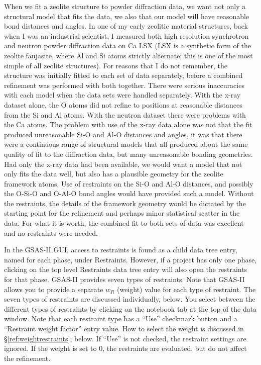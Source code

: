 When we fit a zeolite structure to powder diffraction data, we want not only a structural model that fits the data, we also that our model will have reasonable bond distances and angles. 
In one of my early zeolitic material structures, back when I was an industrial scientist, I measured both high resolution synchrotron and neutron powder diffraction data on Ca LSX (LSX is a synthetic form of the zeolite faujasite, where Al and Si atoms strictly alternate; this is one of the most simple of all zeolite structures).\label{ref:CaLSX}
For reasons that I do not remember, the structure was initially fitted to each set of data separately, before a combined refinement was performed with both together. 
There were serious inaccuracies with each model when the data sets were handled separately. With the x-ray dataset alone, the O atoms did not refine to positions at reasonable distances from the Si and Al atoms. With the neutron dataset there were problems with the Ca atoms. 
The problem with use of the x-ray data alone was not that the fit produced unreasonable Si-O and Al-O distances and angles, it was that there were a continuous range of  structural models that all produced about the same quality of fit to the diffraction data, but many unreasonable bonding geometries. Had only the x-ray data had been available, we would want a model that not only fits the data well, but also has a plausible geometry for the zeolite framework atoms. Use of restraints on the Si-O and Al-O distances, and possibly the O-Si-O and O-Al-O bond angles would have provided such a model. Without the restraints, the details of the framework geometry would be dictated by the starting point for the refinement and perhaps minor statistical scatter in the data.  
For what it is worth, the combined fit to both sets of data was excellent and no restraints were needed. 

In the GSAS-II GUI, access to restraints is found as a child data tree entry, named for each phase, under Restraints. However, if a project has only one phase, clicking on the top level Restraints data tree entry will also open the restraints for that phase. GSAS-II provides seven types of restraints. Note that GSAS-II allows you to provide a separate $w_R$ (weight) value for each type of restraint. The seven types of restraints are discussed individually, below. You select between the different types of restraints by clicking on the notebook tab at the top of the data window. Note that each restraint type has a ``Use'' checkmark button and a ``Restraint weight factor'' entry value. How to select the weight is discussed in \S\ref{ref:weightrestraints}, below. If ``Use'' is not checked, the restraint settings are ignored. If the weight is set to 0, the restraints are evaluated, but do not affect the refinement.

